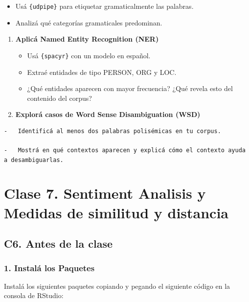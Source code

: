 \documentclass[
  letterpaper,
  DIV=11,
  numbers=noendperiod]{scrreprt}
\begin{document}
\begin{itemize}
\item
  Usá \texttt{\{udpipe\}} para etiquetar gramaticalmente las palabras.
\item
  Analizá qué categorías gramaticales predominan.
\end{itemize}

\begin{enumerate}
\def\labelenumi{\arabic{enumi}.}
\setcounter{enumi}{2}
\item
  \textbf{Aplicá Named Entity Recognition (NER)}

  \begin{itemize}
  \item
    Usá \texttt{\{spacyr\}} con un modelo en español.
  \item
    Extraé entidades de tipo PERSON, ORG y LOC.
  \item
    ¿Qué entidades aparecen con mayor frecuencia? ¿Qué revela esto del
    contenido del corpus?
  \end{itemize}
\item
  \textbf{Explorá casos de Word Sense Disambiguation (WSD)}
\end{enumerate}

\begin{verbatim}
-   Identificá al menos dos palabras polisémicas en tu corpus.

-   Mostrá en qué contextos aparecen y explicá cómo el contexto ayuda a desambiguarlas.
\end{verbatim}

\part{Clase 7. Sentiment Analisis y Medidas de similitud y distancia}

\chapter{C6. Antes de la clase}\label{c6.-antes-de-la-clase-1}

\section{\texorpdfstring{\textbf{1. Instalá los
Paquetes}}{1. Instalá los Paquetes}}\label{instaluxe1-los-paquetes-3}

Instalá los siguientes paquetes copiando y pegando el siguiente código
en la consola de RStudio:
\end{document}
